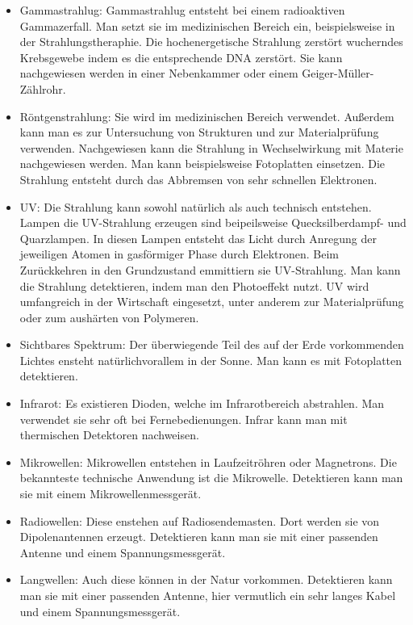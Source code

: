\begin{itemize}
    \item Gammastrahlug: Gammastrahlug entsteht bei einem radioaktiven Gammazerfall. Man setzt sie
    im medizinischen Bereich ein, beispielsweise in der Strahlungstheraphie. Die hochenergetische Strahlung zerstört wucherndes Krebsgewebe indem es die entsprechende DNA zerstört. Sie
    kann nachgewiesen werden in einer Nebenkammer oder einem Geiger-Müller-Zählrohr.
    \item Röntgenstrahlung: Sie wird im medizinischen Bereich verwendet. Außerdem kann man es zur Untersuchung von Strukturen und zur Materialprüfung verwenden. Nachgewiesen kann die Strahlung 
    in Wechselwirkung mit Materie nachgewiesen werden. Man kann beispielsweise Fotoplatten einsetzen. Die Strahlung entsteht durch das Abbremsen von sehr schnellen Elektronen.
    \item UV: Die Strahlung kann sowohl natürlich als auch technisch entstehen. Lampen die UV-Strahlung erzeugen sind beipeilsweise Quecksilberdampf- und Quarzlampen. In diesen Lampen
    entsteht das Licht durch Anregung der jeweiligen Atomen in gasförmiger Phase durch Elektronen. Beim Zurückkehren in den Grundzustand emmittiern sie UV-Strahlung. Man kann die Strahlung
    detektieren, indem man den Photoeffekt nutzt. UV wird umfangreich in der Wirtschaft eingesetzt, unter anderem zur Materialprüfung oder zum aushärten von Polymeren.
    \item Sichtbares Spektrum: Der überwiegende Teil des auf der Erde vorkommenden Lichtes ensteht natürlichvorallem in der Sonne. Man kann es mit Fotoplatten detektieren.
    \item Infrarot: Es existieren Dioden, welche im Infrarotbereich abstrahlen. Man verwendet sie sehr oft bei Fernebedienungen. Infrar kann man mit thermischen Detektoren nachweisen.
    \item Mikrowellen: Mikrowellen entstehen in Laufzeitröhren oder Magnetrons. Die bekannteste technische Anwendung ist die Mikrowelle. Detektieren kann man sie mit einem Mikrowellenmessgerät.
    \item Radiowellen: Diese enstehen auf Radiosendemasten. Dort werden sie von Dipolenantennen erzeugt. Detektieren kann man sie mit einer passenden Antenne und einem Spannungsmessgerät.
    \item Langwellen: Auch diese können in der Natur vorkommen. Detektieren kann man sie mit einer passenden Antenne, hier vermutlich ein sehr langes Kabel und einem Spannungsmessgerät. 
\end{itemize} 